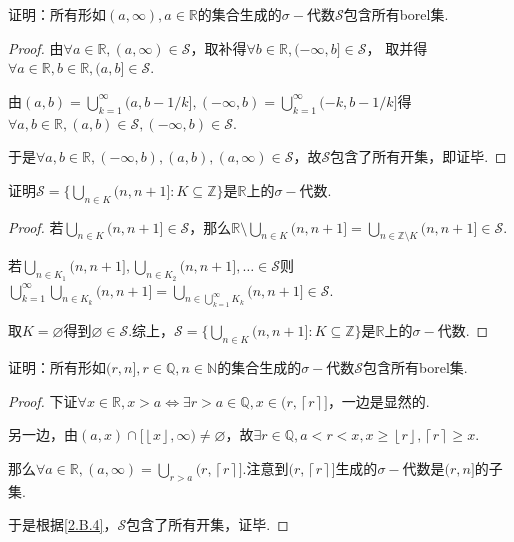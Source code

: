\newpage

\begin{problem}\label{2.39.1}
    证明：所有形如\((a,\infty), a \in \mathbb{R}\)的集合生成的\(\sigma-\)代数\(\mathcal{S}\)包含所有borel集.
\end{problem}

\begin{proof}
    由\(\forall a \in \mathbb{R}, (a,\infty) \in \mathcal{S}\)，取补得\(\forall b \in \mathbb{R}, (-\infty,b] \in \mathcal{S}\)，
    取并得\(\forall a \in \mathbb{R}, b \in \mathbb{R}, (a,b] \in \mathcal{S}\).
    
    由\((a,b)=\bigcup_{k=1}^\infty (a,b-1/k], (-\infty,b)=\bigcup_{k=1}^\infty (-k,b-1/k]\)得\(\forall a,b \in \mathbb{R}, (a,b) \in \mathcal{S}, (-\infty,b) \in \mathcal{S}\).

    于是\(\forall a,b \in \mathbb{R}, (-\infty,b), (a,b), (a, \infty) \in \mathcal{S}\)，故\(\mathcal{S}\)包含了所有开集，即证毕.
\end{proof}

\begin{problem}[1]\label{2.B.1}
    证明\(\mathcal{S}=\{\bigcup_{n \in K}(n,n+1]: K \subseteq \mathbb{Z}\}\)是\(\mathbb{R}\)上的\(\sigma-\)代数.
\end{problem}

\begin{proof}
    若\(\bigcup_{n \in K}(n,n+1] \in \mathcal{S}\)，那么\(\mathbb{R} \setminus \bigcup_{n \in K}(n,n+1]=\bigcup_{n \in \mathbb{Z} \setminus K}(n,n+1] \in \mathcal{S}\).

    若\(\bigcup_{n \in K_1}(n,n+1], \bigcup_{n \in K_2}(n,n+1], \dots \in \mathcal{S}\)则\(\bigcup_{k=1}^\infty \bigcup_{n \in K_k}(n,n+1]=\bigcup_{n \in \bigcup_{k=1}^\infty K_k}(n,n+1] \in \mathcal{S}\).

    取\(K=\varnothing\)得到\(\varnothing \in \mathcal{S}\).综上，\(\mathcal{S}=\{\bigcup_{n \in K}(n,n+1]: K \subseteq \mathbb{Z}\}\)是\(\mathbb{R}\)上的\(\sigma-\)代数.
\end{proof}

\begin{problem}[4]\label{2.B.4}
    证明：所有形如\((r,n], r \in \mathbb{Q}, n \in \mathbb{N}\)的集合生成的\(\sigma-\)代数\(\mathcal{S}\)包含所有borel集.
\end{problem}

\begin{proof}
    下证\(\forall x \in \mathbb{R}, x>a \Longleftrightarrow \exists r>a \in \mathbb{Q}, x \in (r, \left\lceil r \right\rceil]\)，一边是显然的.

    另一边，由\((a,x) \cap [\left\lfloor x \right\rfloor, \infty) \ne \varnothing\)，故\(\exists r \in \mathbb{Q}, a<r<x, x \geq \left\lfloor r \right\rfloor, \left\lceil r \right\rceil \geq x\).

    那么\(\forall a \in \mathbb{R}, (a,\infty)=\bigcup_{r>a}(r, \left\lceil r \right\rceil]\).注意到\((r, \left\lceil r \right\rceil]\)生成的\(\sigma-\)代数是\((r,n]\)的子集.

    于是根据\cref{2.B.4}，\(\mathcal{S}\)包含了所有开集，证毕.
\end{proof}

